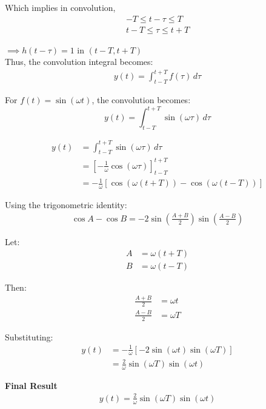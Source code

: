 \documentclass{article}
\begin{document}
Which implies in convolution,
\begin{align*}
    -T \leq t - \tau \leq T \\
    t-T \leq \tau \leq t+T
\end{align*}

$\implies h(t-\tau)=1$ in $(t-T,t+T)$
\\
Thus, the convolution integral becomes:
\begin{align*}
y(t) = \int_{t - T}^{t + T} f(\tau) \, d\tau
\end{align*}

For $f(t) = \sin(\omega t)$, the convolution becomes:
\[
y(t) = \int_{t - T}^{t + T} \sin(\omega \tau) \, d\tau
\]

\begin{align*}
y(t) &= \int_{t - T}^{t + T} \sin(\omega \tau) \, d\tau \\
&= \left[ -\frac{1}{\omega} \cos(\omega \tau) \right]_{t - T}^{t + T} \\
&= -\frac{1}{\omega} \left[ \cos(\omega (t + T)) - \cos(\omega (t - T)) \right]
\end{align*}

Using the trigonometric identity:
\begin{align*}
\cos A - \cos B = -2 \sin\left(\frac{A + B}{2}\right) \sin\left(\frac{A - B}{2}\right) \end{align*}

Let:
\begin{align*}
A &= \omega (t + T) \\
B &= \omega (t - T)
\end{align*}

Then:
\begin{align*}
\frac{A + B}{2} &= \omega t \\
\frac{A - B}{2} &= \omega T
\end{align*}

Substituting:
\begin{align*}
y(t) &= -\frac{1}{\omega} \left[ -2 \sin(\omega t) \sin(\omega T) \right] \\
&= \frac{2}{\omega} \sin(\omega T) \sin(\omega t)
\end{align*}

\textbf{Final Result}
\begin{align*}
y(t) = \frac{2}{\omega} \sin(\omega T) \sin(\omega t)    
\end{align*}
\newpage
\end{document}
